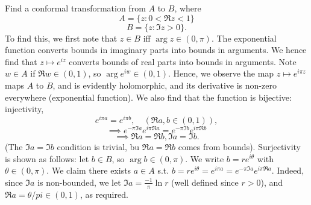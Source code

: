\begin{example}
  Find a conformal transformation from $A$ to $B$, where 
  \[A=\{z: 0 < \Re z < 1\}\]
  \[B=\{z: \Im z>0\}.\]
  To find this, we first note that $z\in B$ iff $\arg z \in (0, \pi)$. The
  exponential function converts bounds in imaginary parts into bounds in
  arguments. We hence find that $z\mapsto e^{iz}$ converts bounds of real parts
  into bounds in arguments. Note $w\in A$ if $\Re w \in(0,1)$, so $\arg e^{iw}
  \in (0,1)$. Hence, we observe the map $z\mapsto e^{i\pi z}$ maps $A$ to $B$,
  and is evidently holomorphic, and its derivative is non-zero everywhere
  (exponential function). We also find that the function is bijective:
  injectivity,
  \[e^{i\pi a} = e^{i\pi b}, \quad (\Re a,b \in (0,1) ),\]
  \[\implies e^{-\pi \Im a}e^{i\pi \Re a} = e^{-\pi \Im b}e^{i\pi \Re b}\]
  \[\implies \Re a = \Re b, \Im a= \Im b.\]
  (The $\Im a=\Im b$ condition is trivial, bu $\Re a=\Re b$ comes from bounds).
  Surjectivity is shown as follows: let $b\in B$, so $\arg b \in (0,\pi)$. We
  write $b= re^{i\theta}$ with $\theta\in (0,\pi)$. We claim there exists $a\in
  A$ s.t. $b=r e^{i\theta}=e^{i\pi a}=e^{-\pi \Im a}e^{i\pi \Re a}$. Indeed,
  since $\Im a$ is non-bounded, we let $\Im a= \frac{-1}{\pi}\ln r$ (well
  defined since $r>0$), and $\Re a = \theta/pi\in (0,1)$, as required.
\end{example}

